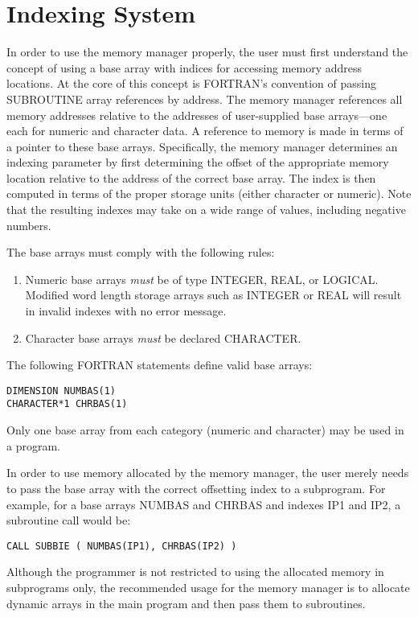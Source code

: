 \section{Indexing System}
In order to use the memory manager properly, the user must first understand
the concept of using a base array with indices for accessing memory
address locations.
At the core of this concept is FORTRAN's convention of passing
SUBROUTINE array references by address.
The memory manager references all memory addresses relative
to the addresses of user-supplied base
arrays---one each for numeric and character data. A reference
to memory is made in terms of a pointer to these base arrays.
Specifically,
the memory manager determines an indexing parameter by first determining the
offset of the appropriate memory location relative to the address
of the correct base
array.
The index is then computed in terms of the proper storage units
(either character or numeric).
Note that the resulting
indexes may take on a wide range of
values, including negative numbers.

The base arrays must comply with the following rules:
\begin{enumerate}
\item Numeric base arrays {\em must} be of type INTEGER, REAL, or LOGICAL.  Modified
word length storage arrays such as INTEGER or REAL will result
in invalid indexes with no error message.

\item Character base arrays {\em must} be declared CHARACTER.
\end{enumerate}

The following FORTRAN statements define valid base arrays:
\begin{verbatim}
DIMENSION NUMBAS(1)
CHARACTER*1 CHRBAS(1)
\end{verbatim}
Only one base array from each category (numeric and character) may
be used in a program.

In order to use memory allocated by the memory manager, the user merely
needs to pass the base array with the correct offsetting
index to a subprogram.
For example, for a base arrays NUMBAS and CHRBAS
and indexes IP1 and IP2, a subroutine call would be:

\verb+CALL SUBBIE ( NUMBAS(IP1), CHRBAS(IP2) )+

Although the programmer is not restricted to using the allocated memory in
subprograms only, the recommended usage for the memory manager is to
allocate dynamic arrays in the main program and then pass them to
subroutines.


